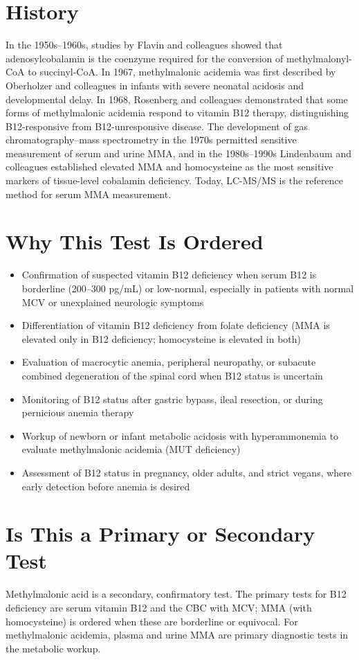 \section*{History}
In the 1950s--1960s, studies by Flavin and colleagues showed that adenosylcobalamin is the coenzyme required for the conversion of methylmalonyl-CoA to succinyl-CoA. In 1967, methylmalonic acidemia was first described by Oberholzer and colleagues in infants with severe neonatal acidosis and developmental delay. In 1968, Rosenberg and colleagues demonstrated that some forms of methylmalonic acidemia respond to vitamin B12 therapy, distinguishing B12-responsive from B12-unresponsive disease. The development of gas chromatography--mass spectrometry in the 1970s permitted sensitive measurement of serum and urine MMA, and in the 1980s--1990s Lindenbaum and colleagues established elevated MMA and homocysteine as the most sensitive markers of tissue-level cobalamin deficiency. Today, LC-MS/MS is the reference method for serum MMA measurement.
\section*{Why This Test Is Ordered}
\begin{itemize}
  \item Confirmation of suspected vitamin B12 deficiency when serum B12 is borderline (200--300 pg/mL) or low-normal, especially in patients with normal MCV or unexplained neurologic symptoms
  \item Differentiation of vitamin B12 deficiency from folate deficiency (MMA is elevated only in B12 deficiency; homocysteine is elevated in both)
  \item Evaluation of macrocytic anemia, peripheral neuropathy, or subacute combined degeneration of the spinal cord when B12 status is uncertain
  \item Monitoring of B12 status after gastric bypass, ileal resection, or during pernicious anemia therapy
  \item Workup of newborn or infant metabolic acidosis with hyperammonemia to evaluate methylmalonic acidemia (MUT deficiency)
  \item Assessment of B12 status in pregnancy, older adults, and strict vegans, where early detection before anemia is desired
\end{itemize}
\section*{Is This a Primary or Secondary Test}
Methylmalonic acid is a secondary, confirmatory test. The primary tests for B12 deficiency are serum vitamin B12 and the CBC with MCV; MMA (with homocysteine) is ordered when these are borderline or equivocal. For methylmalonic acidemia, plasma and urine MMA are primary diagnostic tests in the metabolic workup.
